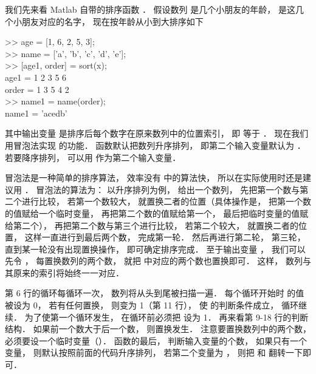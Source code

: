 
我们先来看 Matlab 自带的排序函数 ． 假设数列  是几个小朋友的年龄，  是这几个小朋友对应的名字， 现在按年龄从小到大排序如下
\begin{Command}
>> age = [1, 6, 2, 5, 3];\\
>> name = ['a', 'b', 'c', 'd', 'e'];\\
>> [age1, order] = sort(x);\\
age1 = 1 2 3 5 6\\
order = 1 3 5 4 2\\
>> name1 = name(order);\\
name1 = 'acedb'
\end{Command}
其中输出变量  是排序后每个数字在原来数列中的位置索引， 即  等于 ． 现在我们用冒泡法实现  的功能．  函数默认把数列升序排列， 即第二个输入变量默认为 ． 若要降序排列， 可以用  作为第二个输入变量．

冒泡法是一种简单的排序算法， 效率没有  中的算法快， 所以在实际使用时还是建议用 ． 冒泡法的算法为： 以升序排列为例， 给出一个数列， 先把第一个数与第二个进行比较， 若第一个数较大， 就置换二者的位置（具体操作是， 把第一个数的值赋给一个临时变量， 再把第二个数的值赋给第一个， 最后把临时变量的值赋给第二个）， 再把第二个数与第三个进行比较， 若第二个较大， 就置换二者的位置， 这样一直进行到最后两个数， 完成第一轮． 然后再进行第二轮， 第三轮， 直到某一轮没有出现置换操作， 即可确定排序完成． 至于输出变量 ， 我们可以先令 ， 每置换数列的两个数， 就把  中对应的两个数也置换即可． 这样， 数列与其原来的索引将始终一一对应． 


第 6 行的循环每循环一次， 数列将从头到尾被扫描一遍． 每个循环开始时  的值被设为 0， 若有任何置换，  则变为 1（第 11 行）， 使  的判断条件成立， 循环继续． 为了使第一个循环发生， 在循环前必须把  设为 1． 再来看第 9-18 行的判断结构． 如果前一个数大于后一个数， 则置换发生． 注意要置换数列中的两个数， 必须要设一个临时变量（）． 函数的最后， 判断输入变量的个数， 如果只有一个变量， 则默认按照前面的代码升序排列， 若第二个变量为 ， 则把  和  翻转一下即可．